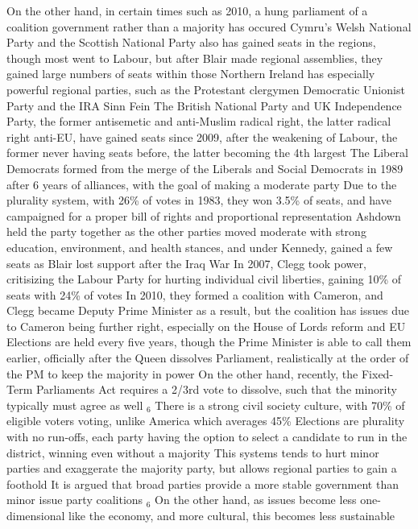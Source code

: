 \documentclass[11 pt, twoside]{article}
\newcommand{\foot}[1]{\hyperlink{#1}{$_#1$}}
\newenvironment{outline*}
{
	\begin{outline}[enumerate]
	}
	{\end{outline}
}
\begin{document}
\begin{outline*}
\3 On the other hand, in certain times such as 2010, a hung parliament of a coalition government rather than a majority has occured
\3 Cymru's Welsh National Party and the Scottish National Party also has gained seats in the regions, though most went to Labour, but after Blair made regional assemblies, they gained large numbers of seats within those
\3 Northern Ireland has especially powerful regional parties, such as the Protestant clergymen Democratic Unionist Party and the IRA Sinn Fein
\3 The British National Party and UK Independence Party, the former antisemetic and anti-Muslim radical right, the latter radical right anti-EU, have gained seats since 2009, after the weakening of Labour, the former never having seats before, the latter becoming the 4th largest
\2 The Liberal Democrats formed from the merge of the Liberals and Social Democrats in 1989 after 6 years of alliances, with the goal of making a moderate party
\3 Due to the plurality system, with 26\% of votes in 1983, they won 3.5\% of seats, and have campaigned for a proper bill of rights and proportional representation
\3 Ashdown held the party together as the other parties moved moderate with strong education, environment, and health stances, and under Kennedy, gained a few seats as Blair lost support after the Iraq War
\3 In 2007, Clegg took power, critisizing the Labour Party for hurting individual civil liberties, gaining 10\% of seats with 24\% of votes
\3 In 2010, they formed a coalition with Cameron, and Clegg became Deputy Prime Minister as a result, but the coalition has issues due to Cameron being further right, especially on the House of Lords reform and EU
\1 Elections are held every five years, though the Prime Minister is able to call them earlier, officially after the Queen dissolves Parliament, realistically at the order of the PM to keep the majority in power
\2 On the other hand, recently, the Fixed-Term Parliaments Act requires a 2/3rd vote to dissolve, such that the minority typically must agree as well \foot{6}
\2 There is a strong civil society culture, with 70\% of eligible voters voting, unlike America which averages 45\%
\2 Elections are plurality with no run-offs, each party having the option to select a candidate to run in the district, winning even without a majority
\3 This systems tends to hurt minor parties and exaggerate the majority party, but allows regional parties to gain a foothold
\3 It is argued that broad parties provide a more stable government than minor issue party coalitions \foot{6}
\4 On the other hand, as issues become less one-dimensional like the economy, and more cultural, this becomes less sustainable

\end{outline*}
\end{document}
